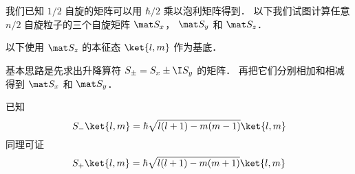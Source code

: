 

我们已知 $1/2$ 自旋的矩阵可以用 $\hbar/2$ 乘以泡利矩阵得到． 以下我们试图计算任意 $n/2$ 自旋粒子的三个自旋矩阵 $\mat S_x$， $\mat S_y$ 和 $\mat S_z$．

以下使用 $\mat S_z$ 的本征态 $\ket{l, m}$ 作为基底．

基本思路是先求出升降算符 $S_\pm = S_x \pm \I S_y$ 的矩阵． 再把它们分别相加和相减得到 $\mat S_x$ 和 $\mat S_y$．

已知 
\begin{equation}
S_- \ket{l,m} = \hbar \sqrt{l(l + 1) - m(m - 1)} \ket{l,m}
\end{equation}
同理可证
\begin{equation}
S_+ \ket{l,m} = \hbar\sqrt{l(l + 1) - m(m + 1)} \ket{l,m}
\end{equation} 
